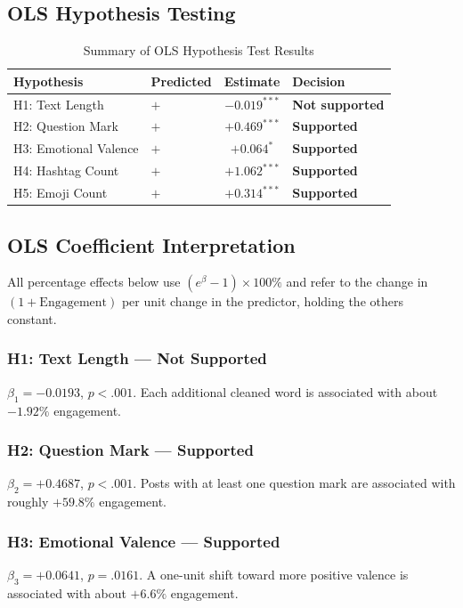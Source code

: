\documentclass[12pt,a4paper]{article}
\begin{document}
\subsection{OLS Hypothesis Testing}

\begin{table}[H]
\centering
\caption{Summary of OLS Hypothesis Test Results}
\small
\begin{tabular}{llcl}
\toprule
Hypothesis & Predicted & Estimate & Decision \\
\midrule
H1: Text Length & $+$ & $-0.019^{***}$ & \textbf{Not supported} \\
H2: Question Mark & $+$ & $+0.469^{***}$ & \textbf{Supported} \\
H3: Emotional Valence & $+$ & $+0.064^{*}$ & \textbf{Supported} \\
H4: Hashtag Count & $+$ & $+1.062^{***}$ & \textbf{Supported} \\
H5: Emoji Count & $+$ & $+0.314^{***}$ & \textbf{Supported} \\
\bottomrule
\end{tabular}
\end{table}

\subsection{OLS Coefficient Interpretation}

All percentage effects below use $(e^{\beta}-1)\times 100\%$ and refer to the change in $(1+\text{Engagement})$ per unit change in the predictor, holding the others constant.

\subsubsection*{H1: Text Length --- Not Supported}
$\beta_1 = -0.0193$, $p<.001$. Each additional cleaned word is associated with about $-1.92\%$ engagement.

\subsubsection*{H2: Question Mark --- Supported}
$\beta_2 = +0.4687$, $p<.001$. Posts with at least one question mark are associated with roughly $+59.8\%$ engagement.

\subsubsection*{H3: Emotional Valence --- Supported}
$\beta_3 = +0.0641$, $p=.0161$. A one-unit shift toward more positive valence is associated with about $+6.6\%$ engagement.
\end{document}
